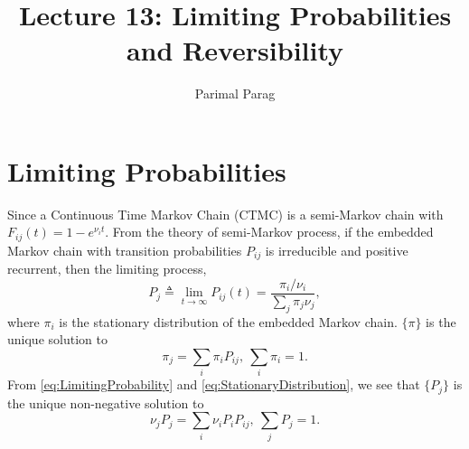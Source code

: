 \documentclass[a4paper,10pt]{article}
\title{Lecture 13: Limiting Probabilities and Reversibility}
\author{Parimal Parag}
\begin{document}
\maketitle
\section{Limiting Probabilities}
Since a Continuous Time Markov Chain (CTMC) is a semi-Markov chain with $F_{ij}(t)=1-e^{\nu_i t}$. From the theory of semi-Markov process, if the embedded Markov chain with transition probabilities $P_{ij}$ is irreducible and positive recurrent, then the limiting process,
\begin{equation}
\label{eq:LimitingProbability}
 P_{j} \triangleq \lim_{t \rightarrow \infty } P_{ij}(t)= \frac{\pi_i / \nu_i}{\sum_j \pi_j \nu_j},
\end{equation}
where $\pi_i$ is the stationary distribution of the embedded Markov chain. $\{\pi\}$ is the unique solution to
\begin{equation}
\label{eq:StationaryDistribution}
\pi_j = \sum_i \pi_i P_{ij},~ \sum_{i}\pi_i = 1. 
\end{equation}
From \ref{eq:LimitingProbability} and \ref{eq:StationaryDistribution}, we see that $\{P_j\}$ is the unique non-negative solution to 
\begin{equation}
\nu_jP_j=\sum_i \nu_iP_iP_{ij},~ \sum_j P_j =1.
\end{equation}
\end{document}
